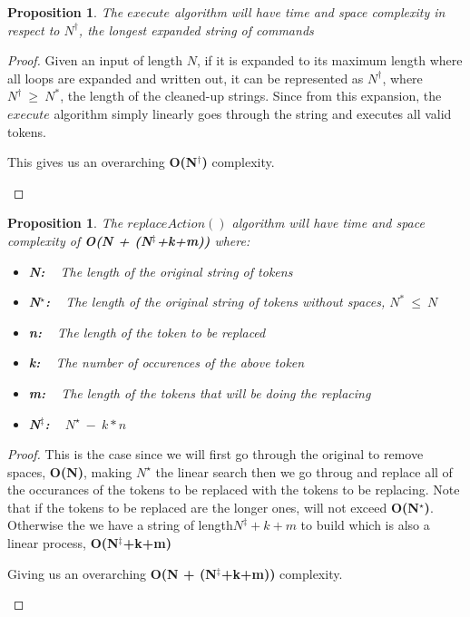 \documentclass[12pt]{article}
\newtheorem{proposition}[theorem]{Proposition}
\begin{document}
\begin{proposition}
\label{numq}
The $execute$ algorithm will have time and space complexity in respect to $N^{\dagger}$, the longest
expanded string of commands
\end{proposition}

\begin{proof}
Given an input of length $N$, if it is expanded to its maximum length where all loops are expanded
and written out, it can be represented as $N^{\dagger}$, where $N^{\dagger}\ \geq\ N^{*}$, the
length of the cleaned-up strings. Since from this expansion, the $execute$ algorithm simply linearly
goes through the string and executes all valid tokens.

\begin{center}
    This gives us an overarching \textbf{O(N$^{\dagger}$)} complexity.
\end{center}

\end{proof}

\begin{proposition}
\label{numq}
The $replaceAction()$ algorithm will have time and space complexity of \textbf{O(N + (N$^{\ddagger}$+k+m))}
where:
\begin{itemize}
 \item \textbf{N:} ~ The length of the original string of tokens
 \item \textbf{N$^{\star}$:} ~ The length of the original string of tokens without spaces, $N^{*}\ \leq\ N$
 \item \textbf{n:} ~ The length of the token to be replaced
 \item \textbf{k:} ~ The number of occurences of the above token
 \item \textbf{m:} ~ The length of the tokens that will be doing the replacing
 \item \textbf{N$^{\ddagger}$:} ~ $N^{\star}\ -\ k*n$
\end{itemize}
\end{proposition}

\begin{proof}
This is the case since we will first go through the original to remove spaces, \textbf{O(N)}, making $N^{\star}$ the
linear search then we go throug and replace all of the occurances of the tokens to be replaced with the tokens to be
replacing. Note that if the tokens to be replaced are the longer ones, will not exceed \textbf{O(N$^{\star}$)}.
Otherwise the we have a string of length$N^{\ddagger}+k+m$ to build which is also a linear process, \textbf{O(N$^{\ddagger}$+k+m)}

\begin{center}
    Giving us an overarching \textbf{O(N + (N$^{\ddagger}$+k+m))} complexity.
\end{center}

\end{proof}
\end{document}
